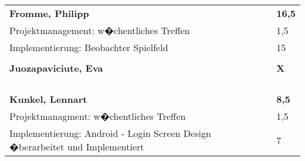 \documentclass[a4paper,11pt]{scrartcl}
\begin{document}
\begin{longtable}{| p{13.8cm} | C{2.4cm} |}

	&

	\\
	\hline
	\hline


	\textbf{Fromme, Philipp} & \textbf{16,5}\\ %
	\hline

	Projektmanagement: w�chentliches Treffen
	&
	1,5
	\\
	\hline

	Implementierung: Beobachter Spielfeld
	&
	15
	\\
	\hline


	&

	\\
	\hline
	\hline


	\textbf{Juozapaviciute, Eva} & \textbf{X}\\ %
	\hline


	&

	\\
	\hline


	&

	\\
	\hline


	&

	\\
	\hline


	&

	\\
	\hline
	\hline


	\textbf{Kunkel, Lennart} & \textbf{8,5}\\ %
	\hline

  Projektmanagment: w�chentliches Treffen
	&
  1,5
	\\
	\hline

  Implementierung: Android - Login Screen Design �berarbeitet und Implementiert
	&
  7
	\\
	\hline


\end{longtable}
\end{document}
